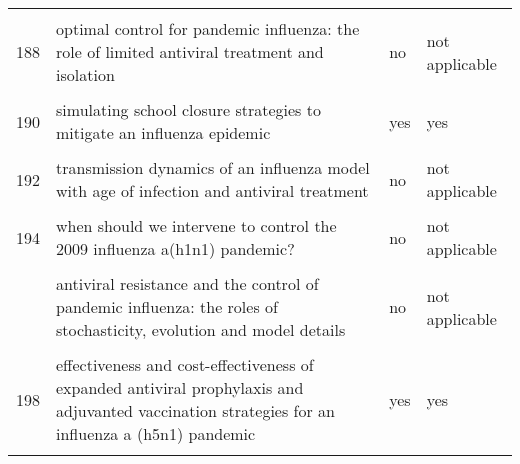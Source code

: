 \documentclass[
]{article}
\begin{document}
\begin{landscape}
\begin{longtable}{l>{\raggedright\arraybackslash}p{9cm}ll}
\cellcolor{gray!6}{187} & \cellcolor{gray!6}{is a mass immunization program for pandemic (h1n1) 2009 good value for money? early evidence from the canadian experience} & \cellcolor{gray!6}{no} & \cellcolor{gray!6}{not applicable}\\
188 & optimal control for pandemic influenza: the role of limited antiviral treatment and isolation & no & not applicable\\
\cellcolor{gray!6}{189} & \cellcolor{gray!6}{optimizing vaccine allocation at different points in time during an epidemic} & \cellcolor{gray!6}{no} & \cellcolor{gray!6}{not applicable}\\
190 & simulating school closure strategies to mitigate an influenza epidemic & yes & yes\\
\addlinespace
\cellcolor{gray!6}{191} & \cellcolor{gray!6}{the effect of mask use on the spread of influenza during a pandemic} & \cellcolor{gray!6}{no} & \cellcolor{gray!6}{not applicable}\\
192 & transmission dynamics of an influenza model with age of infection and antiviral treatment & no & not applicable\\
\cellcolor{gray!6}{193} & \cellcolor{gray!6}{transmission risks and control of foot-and-mouth disease in the netherlands: spatial patterns} & \cellcolor{gray!6}{yes} & \cellcolor{gray!6}{no}\\
194 & when should we intervene to control the 2009 influenza a(h1n1) pandemic? & no & not applicable\\
\cellcolor{gray!6}{195} & \cellcolor{gray!6}{adaptive vaccination strategies to mitigate pandemic influenza} & \cellcolor{gray!6}{yes} & \cellcolor{gray!6}{yes}\\
\addlinespace
196 & antiviral resistance and the control of pandemic influenza: the roles of stochasticity, evolution and model details & no & not applicable\\
\cellcolor{gray!6}{197} & \cellcolor{gray!6}{economic evaluation of influenza pandemic mitigation strategies in the united states using a stochastic microsimulation transmission model} & \cellcolor{gray!6}{no} & \cellcolor{gray!6}{not applicable}\\
198 & effectiveness and cost-effectiveness of expanded antiviral prophylaxis and adjuvanted vaccination strategies for an influenza a (h5n1) pandemic & yes & yes\\
\cellcolor{gray!6}{199} & \cellcolor{gray!6}{engineering responses to pandemics} & \cellcolor{gray!6}{no} & \cellcolor{gray!6}{not applicable}\\

\end{longtable}
\end{landscape}
\end{document}
